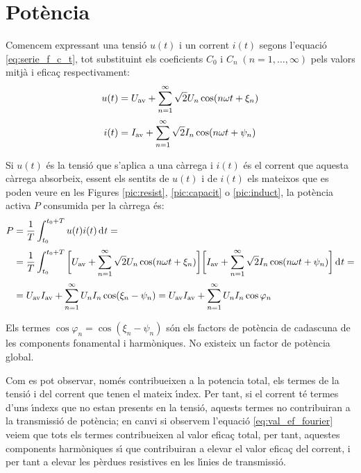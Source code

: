 \section{Pot\`{e}ncia}

Comencem expressant una tensi\'{o} $u(t)$ i un corrent $i(t)$
 segons l'equaci\'{o} \eqref{eq:serie_f_c_t}, tot substituint els
 coeficients $C_0$ i $C_n \;(n=1,\ldots,\infty)$ pels valors mitj\`{a} i efica\c{c}
 respectivament:
 \begin{align}
    u(t)  &= U_\mathrm{av} + \sum_{n=1}^\infty \sqrt{2} U_n \cos (n \omega t +
    \xi_n)\\[0.5ex]
    i(t)  &= I_\mathrm{av} + \sum_{n=1}^\infty \sqrt{2} I_n \cos (n \omega t + \psi_n)
 \end{align}

Si  $u(t)$ \'{e}s la tensi\'{o} que s'aplica a una c\`{a}rrega i $i(t)$ \'{e}s el
corrent que aquesta c\`{a}rrega absorbeix, essent els sentits de $u(t)$
i de $i(t)$ els mateixos que es poden veure en les Figures
\ref{pic:resist}, \ref{pic:capacit} o \ref{pic:induct}, la pot\`{e}ncia
activa $P$ consumida per la c\`{a}rrega \'{e}s:
\begin{equation}\begin{split}
    P &= \frac{1}{T} \int_{t_0}^{t_0+T} u(t) i(t) \diff t =
    \\[0.5ex]
     &= \frac{1}{T} \int_{t_0}^{t_0+T} \bigg[U\ped{av} + \sum_{n=1}^\infty
    \sqrt{2} U_n \cos (n \omega t + \xi_n) \bigg]
    \bigg[I\ped{av} + \sum_{n=1}^\infty \sqrt{2} I_n
    \cos (n \omega t + \psi_n)\bigg] \diff t=\\[0.5ex]
    &=U\ped{av}I\ped{av} + \sum_{n=1}^\infty U_n I_n
    \cos(\xi_n-\psi_n) = U\ped{av}I\ped{av} + \sum_{n=1}^\infty U_n I_n
    \cos \varphi_n \label{eq:pot_fu}
\end{split}\end{equation}

Els termes $\cos \varphi_n=\cos (\xi_n-\psi_n)$ s\'{o}n els factors de
pot\`{e}ncia de cadascuna de les components fonamental i harm\`{o}niques. No
existeix un factor de pot\`{e}ncia global.

 Com es pot observar, nom\'{e}s contribueixen a la potencia
total, els termes de la tensi\'{o} i del corrent que tenen el mateix
\'{\i}ndex. Per tant, si el corrent t\'{e} termes d'uns \'{\i}ndexs que no estan
presents en la tensi\'{o}, aquests termes no contribuiran a la
transmissi\'{o} de  pot\`{e}ncia; en canvi si observem l'equaci\'{o}
\eqref{eq:val_ef_fourier} veiem que tots els termes contribueixen al
valor efica\c{c} total, per tant, aquestes components harm\`{o}niques s\'{\i} que
contribuiran a elevar el valor efica\c{c} del corrent, i per tant a
elevar les p\`{e}rdues resistives en les l\'{\i}nies de transmissi\'{o}.

